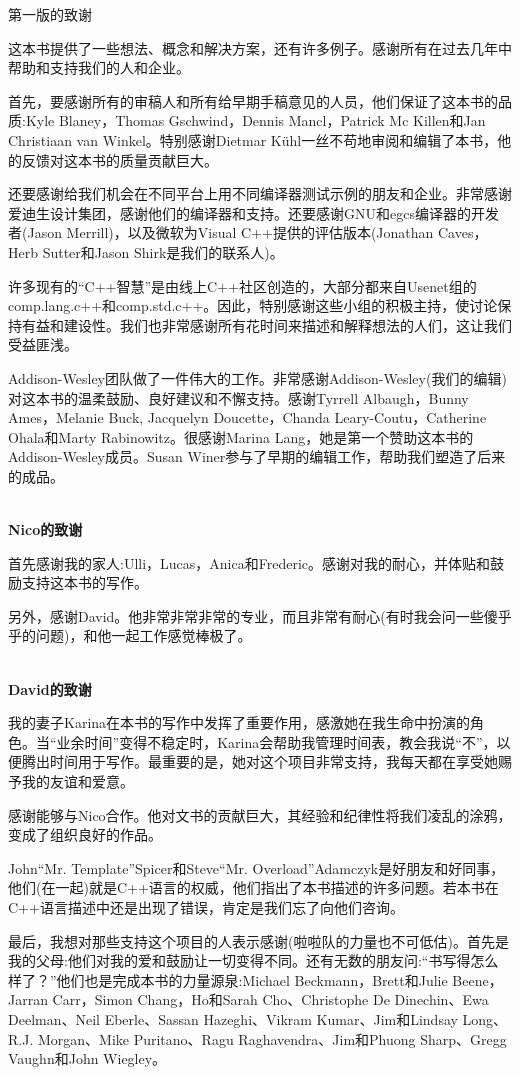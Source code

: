 \begin{flushright}
 第一版的致谢
\end{flushright}

这本书提供了一些想法、概念和解决方案，还有许多例子。感谢所有在过去几年中帮助和支持我们的人和企业。

首先，要感谢所有的审稿人和所有给早期手稿意见的人员，他们保证了这本书的品质:Kyle Blaney，Thomas Gschwind，Dennis Mancl，Patrick Mc Killen和Jan Christiaan van Winkel。特别感谢Dietmar K{\"u}hl一丝不苟地审阅和编辑了本书，他的反馈对这本书的质量贡献巨大。

还要感谢给我们机会在不同平台上用不同编译器测试示例的朋友和企业。非常感谢爱迪生设计集团，感谢他们的编译器和支持。还要感谢GNU和egcs编译器的开发者(Jason Merrill)，以及微软为Visual C++提供的评估版本(Jonathan Caves，Herb Sutter和Jason Shirk是我们的联系人)。

许多现有的“C++智慧”是由线上C++社区创造的，大部分都来自Usenet组的comp.lang.c++和comp.std.c++。因此，特别感谢这些小组的积极主持，使讨论保持有益和建设性。我们也非常感谢所有花时间来描述和解释想法的人们，这让我们受益匪浅。

Addison-Wesley团队做了一件伟大的工作。非常感谢Addison-Wesley(我们的编辑)对这本书的温柔鼓励、良好建议和不懈支持。感谢Tyrrell Albaugh，Bunny Ames，Melanie Buck, Jacquelyn Doucette，Chanda Leary-Coutu，Catherine Ohala和Marty Rabinowitz。很感谢Marina Lang，她是第一个赞助这本书的Addison-Wesley成员。Susan Winer参与了早期的编辑工作，帮助我们塑造了后来的成品。

\hspace*{\fill} \\ %
\noindent\textbf{Nico的致谢}

首先感谢我的家人:Ulli，Lucas，Anica和Frederic。感谢对我的耐心，并体贴和鼓励支持这本书的写作。

另外，感谢David。他非常非常非常的专业，而且非常有耐心(有时我会问一些傻乎乎的问题)，和他一起工作感觉棒极了。

\hspace*{\fill} \\ %
\noindent\textbf{David的致谢}

我的妻子Karina在本书的写作中发挥了重要作用，感激她在我生命中扮演的角色。当“业余时间”变得不稳定时，Karina会帮助我管理时间表，教会我说“不”，以便腾出时间用于写作。最重要的是，她对这个项目非常支持，我每天都在享受她赐予我的友谊和爱意。

感谢能够与Nico合作。他对文书的贡献巨大，其经验和纪律性将我们凌乱的涂鸦，变成了组织良好的作品。

John“Mr. Template”Spicer和Steve“Mr. Overload”Adamczyk是好朋友和好同事，他们(在一起)就是C++语言的权威，他们指出了本书描述的许多问题。若本书在C++语言描述中还是出现了错误，肯定是我们忘了向他们咨询。

最后，我想对那些支持这个项目的人表示感谢(啦啦队的力量也不可低估)。首先是我的父母:他们对我的爱和鼓励让一切变得不同。还有无数的朋友问:“书写得怎么样了？”他们也是完成本书的力量源泉:Michael Beckmann，Brett和Julie Beene，Jarran Carr，Simon Chang，Ho和Sarah Cho、Christophe De Dinechin、Ewa Deelman、Neil Eberle、Sassan Hazeghi、Vikram Kumar、Jim和Lindsay Long、R.J. Morgan、Mike Puritano、Ragu Raghavendra、Jim和Phuong Sharp、Gregg Vaughn和John Wiegley。



